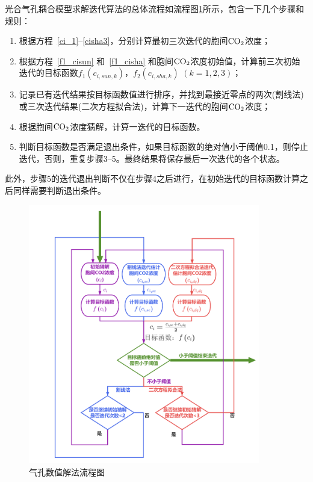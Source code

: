 光合气孔耦合模型求解迭代算法的总体流程如流程图\ref{fig:气孔数值解法流程图}所示，包含一下几个步骤和规则：
\begin{enumerate}
\item 
根据方程~\eqref{ci_1}--\eqref{cisha3}，分别计算最初三次迭代的胞间$\rm CO_2$浓度；
\item 
根据方程~\eqref{f1_cisun} 和~\eqref{f1_cisha} 和胞间$\rm CO_2$浓度初始值，计算前三次初始迭代的目标函数$f_1\left(c_{i,sun,k}\right)$，$f_2\left(c_{i,sha,k}\right)$ $\left(k=1,2,3\right)$；
\item
记录已有迭代结果按目标函数值进行排序，并找到最接近零点的两次(割线法)或三次迭代结果(二次方程拟合法)，计算下一迭代的胞间$\rm CO_2$浓度；
\item
根据胞间$\rm CO_2$浓度猜解，计算一迭代的目标函数。
\item
判断目标函数是否满足退出条件，如果目标函数的绝对值小于阈值0.1，则停止迭代，否则，重复步骤3--5。最终结果将保存最后一次迭代的各个状态。
\end{enumerate}
此外，步骤5的迭代退出判断不仅在步骤4之后进行，在初始迭代的目标函数计算之后同样需要判断退出条件。

{
\begin{figure}[htbp]
\centering
\includegraphics[width=0.9\textwidth]{Figures/气孔导度和光合作用/气孔数值解法流程图.png}
\caption{气孔数值解法流程图}
\label{fig:气孔数值解法流程图}
\end{figure}
}